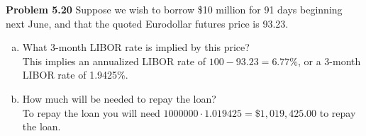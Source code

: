 \documentclass[12pt]{article}
\newcommand{\problem}[1]{\bigskip \noindent \textbf{Problem #1}}
\theoremstyle{plain}
\begin{document}
\problem{5.20} Suppose we wish to borrow \$10 million for 91 days beginning next June, and that the quoted Eurodollar futures price is 93.23.
\begin{enumerate}[(a)]
\item What 3-month LIBOR rate is implied by this price?\\

This implies an annualized LIBOR rate of $100 - 93.23 = 6.77\%$, or a 3-month LIBOR rate of 1.9425\%.\\

\item How much will be needed to repay the loan?\\

To repay the loan you will need $1000000\cdot 1.019425 = \$1,019,425.00$ to repay the loan.
\end{enumerate}
\end{document}
